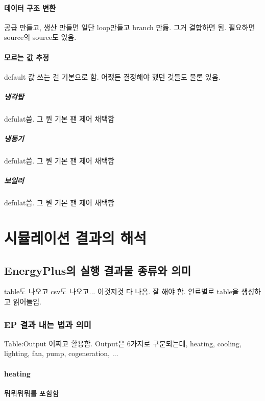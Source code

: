 \subsubsection{데이터 구조 변환}
공급 만들고, 생산 만들면 일단 loop만들고 branch 만듦.
그거 결합하면 됨.
필요하면 source의 source도 있음.

\subsubsection{모르는 값 추정}
default 값 쓰는 걸 기본으로 함. 어쨌든 결정해야 했던 것들도 물론 있음.
\paragraph{냉각탑} defulat씀. 그 뭔 기본 팬 제어 채택함
\paragraph{냉동기} defulat씀. 그 뭔 기본 팬 제어 채택함
\paragraph{보일러} defulat씀. 그 뭔 기본 팬 제어 채택함


\chapter{시뮬레이션 결과의 해석}

\section{EnergyPlus의 실행 결과물 종류와 의미}
table도 나오고 csv도 나오고... 이것저것 다 나옴. 잘 해야 함. 연료별로 table을 생성하고 읽어들임.

\subsection{EP 결과 내는 법과 의미}
Table:Output 어쩌고 활용함. Output은 6가지로 구분되는데, heating, cooling, lighting, fan, pump, cogeneration, ...

\subsubsection{heating}
뭐뭐뭐뭐를 포함함

